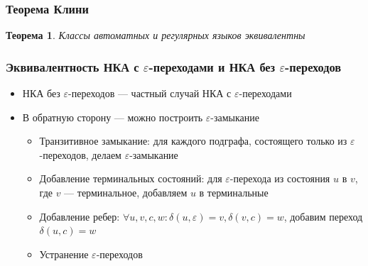 \documentclass{beamer}
\newtheorem{rutheorem}{Теорема}
\newenvironment{myauto}[1][3]
{
  \begin{center}
    \begin{tikzpicture}[> = stealth,node distance=#1cm, on grid, very thick]
}
{
    \end{tikzpicture}
  \end{center}
}
\begin{document}
\begin{frame}[fragile]
  \transwipe[direction=90]
  \frametitle{Теорема Клини}
  \begin{rutheorem}
   Классы автоматных и регулярных языков \emph{эквивалентны}
  \end{rutheorem}
\end{frame}



\begin{frame}[fragile]
  \transwipe[direction=90]
  \frametitle{Эквивалентность НКА с $\varepsilon$-переходами и НКА без $\varepsilon$-переходов }
  \begin{itemize}
    \item НКА без $\varepsilon$-переходов --- частный случай НКА с $\varepsilon$-переходами
    \item В обратную сторону --- можно построить $\varepsilon$-замыкание
    \begin{itemize}
      \item Транзитивное замыкание: для каждого подграфа, состоящего только из $\varepsilon$-переходов, делаем $\varepsilon$-замыкание
      \item Добавление терминальных состояний: для $\varepsilon$-перехода из состояния $u$ в $v$, где $v$ --- терминальное, добавляем $u$ в терминальные
      \item Добавление ребер: $\forall u, v, c, w: \delta(u,\varepsilon)=v, \delta(v,c)=w$, добавим переход $\delta(u,c)=w$
      \item Устранение $\varepsilon$-переходов
    \end{itemize}
  \end{itemize}
\end{frame}
\end{document}

